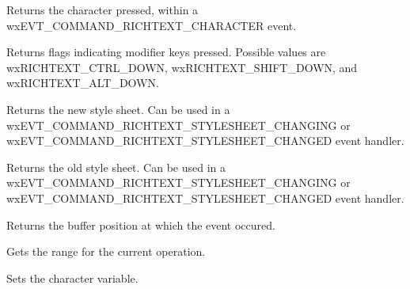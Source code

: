 \label{wxrichtexteventgetcharacter}


Returns the character pressed, within a wxEVT\_COMMAND\_RICHTEXT\_CHARACTER event.

\label{wxrichtexteventgetflags}


Returns flags indicating modifier keys pressed. Possible values are wxRICHTEXT\_CTRL\_DOWN,
wxRICHTEXT\_SHIFT\_DOWN, and wxRICHTEXT\_ALT\_DOWN.

\label{wxrichtexteventgetnewstylesheet}


Returns the new style sheet. Can be used in a wxEVT\_COMMAND\_RICHTEXT\_STYLESHEET\_CHANGING or
wxEVT\_COMMAND\_RICHTEXT\_STYLESHEET\_CHANGED event handler.

\label{wxrichtexteventgetoldstylesheet}


Returns the old style sheet. Can be used in a wxEVT\_COMMAND\_RICHTEXT\_STYLESHEET\_CHANGING or
wxEVT\_COMMAND\_RICHTEXT\_STYLESHEET\_CHANGED event handler.

\label{wxrichtexteventgetposition}


Returns the buffer position at which the event occured.

\label{wxrichtexteventgetrange}


Gets the range for the current operation.

\label{wxrichtexteventsetcharacter}


Sets the character variable.

\label{wxrichtexteventsetflags}


